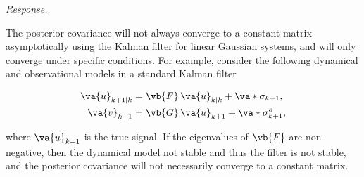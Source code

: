 \textit{Response.}

The posterior covariance will not always converge to a constant matrix asymptotically using the Kalman filter for linear Gaussian systems, and will only converge under specific conditions. For example, consider the following dynamical and observational models in a standard Kalman filter

\begin{subequations}
	\begin{align}
		\va{u}_{k+1 \vert k} &= \vb{F}\,\va{u}_{k \vert k} + \va*{\sigma}_{k+1}, \\
		\va{v}_{k+1} &= \vb{G}\,\va{u}_{k+1} + \va*{\sigma}_{k+1}^{o},
	\end{align}
\end{subequations}

where $\va{u}_{k+1}$ is the true signal. If the eigenvalues of $\vb{F}$ are non-negative, then the dynamical model not stable and thus the filter is not stable, and the posterior covariance will not necessarily converge to a constant matrix.

